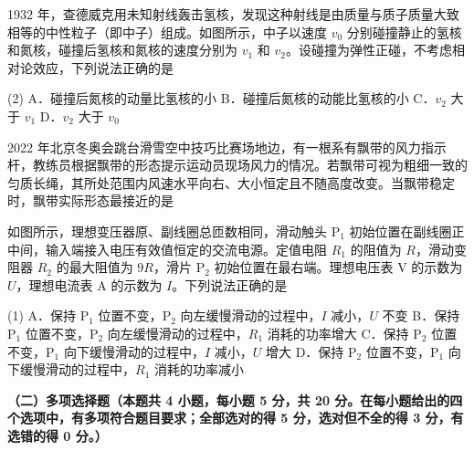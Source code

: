 \begin{question}
1932 年，查德威克用未知射线轰击氢核，发现这种射线是由质量与质子质量大致相等的中性粒子（即中子）组成。如图所示，中子以速度 $v_{0}$ 分别碰撞静止的氢核和氮核，碰撞后氢核和氮核的速度分别为 $v_{1}$ 和 $v_{2}$。设碰撞为弹性正碰，不考虑相对论效应，下列说法正确的是\gkblank


\begin{gkopts}(2)
  \task A．碰撞后氮核的动量比氢核的小
  \task B．碰撞后氮核的动能比氢核的小
  \task C．$v_{2}$ 大于 $v_{1}$
  \task D．$v_{2}$ 大于 $v_{0}$
\end{gkopts}
\end{question}

\begin{question}
2022 年北京冬奥会跳台滑雪空中技巧比赛场地边，有一根系有飘带的风力指示杆，教练员根据飘带的形态提示运动员现场风力的情况。若飘带可视为粗细一致的匀质长绳，其所处范围内风速水平向右、大小恒定且不随高度改变。当飘带稳定时，飘带实际形态最接近的是\gkblank

\end{question}

\begin{question}
如图所示，理想变压器原、副线圈总匝数相同，滑动触头 $\mathrm{P}_{1}$ 初始位置在副线圈正中间，输入端接入电压有效值恒定的交流电源。定值电阻 $R_{1}$ 的阻值为 $R$，滑动变阻器 $R_{2}$ 的最大阻值为 $9R$，滑片 $\mathrm{P}_{2}$ 初始位置在最右端。理想电压表 $\mathrm{V}$ 的示数为 $U$，理想电流表 $\mathrm{A}$ 的示数为 $I$。下列说法正确的是\gkblank


\begin{gkopts}(1)
  \task A．保持 $\mathrm{P}_{1}$ 位置不变，$\mathrm{P}_{2}$ 向左缓慢滑动的过程中，$I$ 减小，$U$ 不变
  \task B．保持 $\mathrm{P}_{1}$ 位置不变，$\mathrm{P}_{2}$ 向左缓慢滑动的过程中，$R_{1}$ 消耗的功率增大
  \task C．保持 $\mathrm{P}_{2}$ 位置不变，$\mathrm{P}_{1}$ 向下缓慢滑动的过程中，$I$ 减小，$U$ 增大
  \task D．保持 $\mathrm{P}_{2}$ 位置不变，$\mathrm{P}_{1}$ 向下缓慢滑动的过程中，$R_{1}$ 消耗的功率减小
\end{gkopts}
\end{question}

\textbf{（二）多项选择题（本题共 4 小题，每小题 5 分，共 20 分。在每小题给出的四个选项中，有多项符合题目要求；全部选对的得 5 分，选对但不全的得 3 分，有选错的得 0 分。）}

